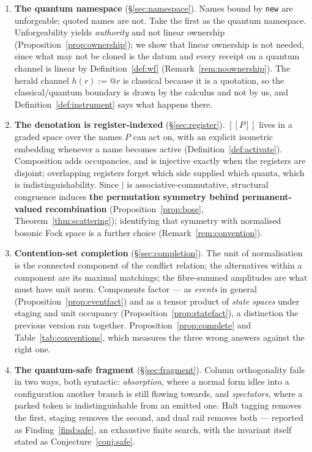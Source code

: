 \documentclass[11pt,a4paper]{article}
\theoremstyle{plain}
\theoremstyle{definition}
\theoremstyle{remark}
\newcommand{\sem}[1]{[\![#1]\!]}
\begin{document}
\begin{enumerate}[leftmargin=1.4em,itemsep=3pt]
\item \textbf{The quantum namespace} (\S\ref{sec:namespace}). Names bound by
\texttt{new} are unforgeable; quoted names are not. Take the first as the
quantum namespace. Unforgeability yields \emph{authority} and not linear
ownership (Proposition~\ref{prop:ownership}); we show that linear ownership is
not needed, since what may not be cloned is the datum and every receipt on a
quantum channel is linear by Definition~\ref{def:wf}
(Remark~\ref{rem:noownership}). The herald channel $h(r) := @r$ is classical
because it is a quotation, so the classical/quantum boundary is drawn by the
calculus and not by us, and Definition~\ref{def:instrument} says what happens
there.

\item \textbf{The denotation is register-indexed} (\S\ref{sec:register}).
$\sem{P}$ lives in a graded space over the names $P$ can act on, with an
explicit isometric embedding whenever a name becomes active
(Definition~\ref{def:activate}). Composition adds occupancies, and is injective
exactly when the registers are disjoint; overlapping registers forget which side
supplied which quanta, which is indistinguishability. Since $\mid$ is
associative-commutative, structural congruence induces \textbf{the permutation
symmetry behind permanent-valued recombination}
(Proposition~\ref{prop:bose}, Theorem~\ref{thm:scattering}); identifying that
symmetry with normalised bosonic Fock space is a further choice
(Remark~\ref{rem:convention}).

\item \textbf{Contention-set completion} (\S\ref{sec:completion}). The unit of
normalisation is the connected component of the conflict relation; the
alternatives within a component are its maximal matchings; the fibre-summed
amplitudes are what must have unit norm. Components factor --- as
\emph{events} in general (Proposition~\ref{prop:eventfact}) and as a tensor
product of \emph{state spaces} under staging and unit occupancy
(Proposition~\ref{prop:statefact}), a distinction the previous version ran
together. Proposition~\ref{prop:complete} and Table~\ref{tab:conventions},
which measures the three wrong answers against the right one.

\item \textbf{The quantum-safe fragment} (\S\ref{sec:fragment}). Column
orthogonality fails in two ways, both syntactic: \emph{absorption}, where a
normal form idles into a configuration another branch is still flowing towards,
and \emph{spectators}, where a parked token is indistinguishable from an emitted
one. Halt tagging removes the first, staging removes the second, and dual rail
removes both --- reported as Finding~\ref{find:safe}, an exhaustive finite
search, with the invariant itself stated as Conjecture~\ref{conj:safe}.


\end{enumerate}
\end{document}
